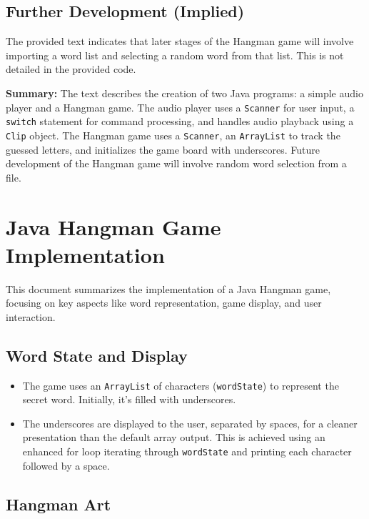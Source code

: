 \documentclass{article}
\begin{document}
\begin{itemize}
\subsection{Further Development (Implied)}

The provided text indicates that later stages of the Hangman game will involve importing a word list and selecting a random word from that list.  This is not detailed in the provided code.



\textbf{Summary:} The text describes the creation of two Java programs: a simple audio player and a Hangman game.  The audio player uses a \texttt{Scanner} for user input, a \texttt{switch} statement for command processing, and handles audio playback using a \texttt{Clip} object. The Hangman game uses a \texttt{Scanner}, an \texttt{ArrayList} to track the guessed letters, and initializes the game board with underscores.  Future development of the Hangman game will involve random word selection from a file.


\section{Java Hangman Game Implementation}

This document summarizes the implementation of a Java Hangman game, focusing on key aspects like word representation, game display, and user interaction.

\subsection{Word State and Display}

\begin{itemize}
    \item The game uses an \texttt{ArrayList} of characters (\texttt{wordState}) to represent the secret word. Initially, it's filled with underscores.
    \item The underscores are displayed to the user, separated by spaces, for a cleaner presentation than the default array output.  This is achieved using an enhanced for loop iterating through \texttt{wordState} and printing each character followed by a space.
\end{itemize}

\subsection{Hangman Art}


\end{itemize}
\end{document}
